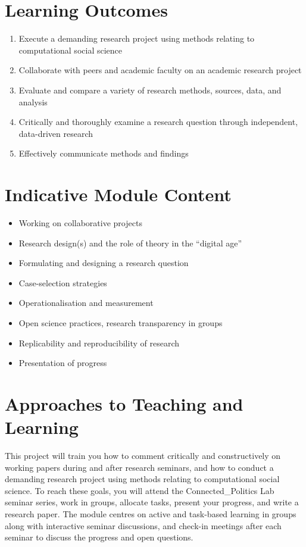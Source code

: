 \documentclass[abstract=on,parskip=full,headings=standardclasses,fontsize=11pt,paper=a4]{scrartcl}
\begin{document}
\section*{Learning Outcomes}

\begin{enumerate}
\item  Execute a demanding research project using methods relating to computational social science
\item  Collaborate with peers and academic faculty on an academic research project
\item Evaluate and compare a variety of research methods, sources, data, and analysis
\item Critically and thoroughly examine a research question through independent, data-driven research
\item Effectively communicate methods and findings
\end{enumerate}


\section*{Indicative Module Content}


\begin{itemize}
\item Working on collaborative projects
\item Research design(s) and the role of theory in the ``digital age''
\item Formulating and designing a research question
\item Case-selection strategies
\item Operationalisation and measurement
\item  Open science practices, research transparency in groups
\item Replicability and reproducibility of research
\item Presentation of progress
\end{itemize}


\section*{Approaches to Teaching and Learning}


This project will train you how to comment critically and constructively on working papers during and after  research seminars, and how to conduct a demanding research project using methods relating to computational social science. To reach these goals, you will  attend the Connected\_Politics Lab seminar series,  work in groups,  allocate tasks, present your progress, and write a research paper. The module centres on active and task-based learning in groups along with interactive seminar discussions, and check-in meetings after each seminar to discuss the progress and open questions.
\end{document}
